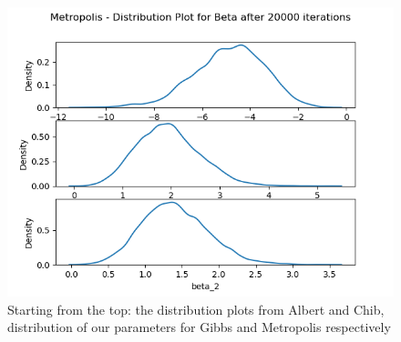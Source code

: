 \documentclass{article}
\begin{document}
\begin{figure}[htp]
    \includegraphics[scale=0.41]{images/dist_metropolis_noinfo_20000_warmup_0.png}
    \caption{Starting from the top: the distribution plots from Albert and Chib, distribution of our parameters for Gibbs and Metropolis respectively}
    \label{fig:ar}
\end{figure}



\end{document}
